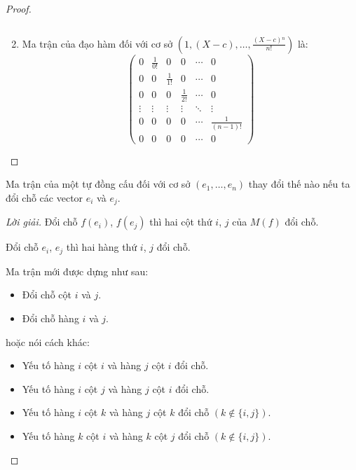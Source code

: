 \documentclass[class=linearalgebra,crop=false]{standalone}
\begin{document}
\begin{proof}
\begin{enumerate}[label = (\alph*)]
\[              \]
        \item Ma trận của đạo hàm đối với cơ sở $(1, (X-c), \ldots, \frac{(X-c){}^{n}}{n!})$ là:
              \[
                  \begin{pmatrix}
                      0      & \frac{1}{0!} & 0            & 0            & \cdots & 0                \\
                      0      & 0            & \frac{1}{1!} & 0            & \cdots & 0                \\
                      0      & 0            & 0            & \frac{1}{2!} & \cdots & 0                \\
                      \vdots & \vdots       & \vdots       & \vdots       & \ddots & \vdots           \\
                      0      & 0            & 0            & 0            & \cdots & \frac{1}{(n-1)!} \\
                      0      & 0            & 0            & 0            & \cdots & 0
                  \end{pmatrix}
              \]
    \end{enumerate}
\end{proof}

\begin{exercise}
    Ma trận của một tự đồng cấu đối với cơ sở $(e_{1},\ldots,e_{n})$ thay đổi thế nào nếu ta đổi chỗ các vector $e_{i}$ và $e_{j}$.
\end{exercise}

\begin{proof}[Lời giải]
    Đổi chỗ $f(e_{i})$, $f(e_{j})$ thì hai cột thứ $i$, $j$ của $M(f)$ đổi chỗ.
    \par Đổi chỗ $e_{i}$, $e_{j}$ thì hai hàng thứ $i$, $j$ đổi chỗ.
    \par Ma trận mới được dựng như sau:
    \begin{itemize}
        \item Đổi chỗ cột $i$ và $j$.
        \item Đổi chỗ hàng $i$ và $j$.
    \end{itemize}
    \par hoặc nói cách khác:
    \begin{itemize}
        \item Yếu tố hàng $i$ cột $i$ và hàng $j$ cột $i$ đổi chỗ.
        \item Yếu tố hàng $i$ cột $j$ và hàng $j$ cột $i$ đổi chỗ.
        \item Yếu tố hàng $i$ cột $k$ và hàng $j$ cột $k$ đổi chỗ $(k\not\in\{ i, j \})$.
        \item Yếu tố hàng $k$ cột $i$ và hàng $k$ cột $j$ đổi chỗ $(k\not\in\{ i, j \})$.
    \end{itemize}
\end{proof}
\end{document}

